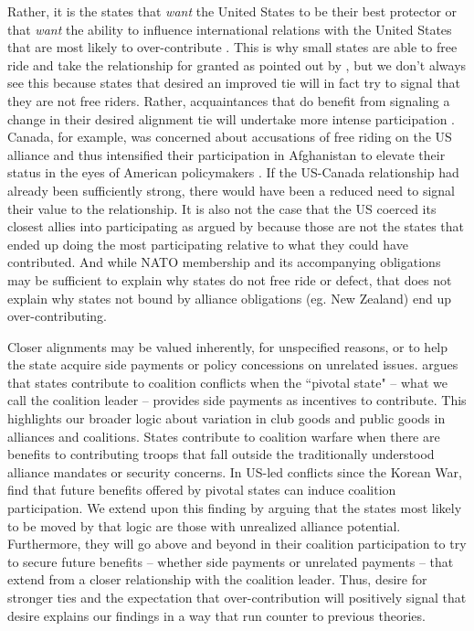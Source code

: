 \documentclass[12pt,letterpaper]{article}
\begin{document}
	Rather, it is the states that \textit{want} the United States to be their best protector or that \textit{want} the ability to influence international relations with the United States that are most likely to over-contribute \citep{vonhlatky_greatasymmetryamerica_2010}. This is why small states are able to free ride and take the relationship for granted as pointed out by \citet{keohane_biginfluencesmall_1971}, but we don't always see this because states that desired an improved tie will in fact try to signal that they are not free riders. Rather, acquaintances that do benefit from signaling a change in their desired alignment tie will undertake more intense participation \citep{gibler_priorcommitmentscompatible_2004, gartzke_contractsfriendsalliances_2012}. Canada, for example, was concerned about accusations of free riding on the US alliance and thus intensified their participation in Afghanistan to elevate their status in the eyes of American policymakers \citep{massie_alliancevaluestatus_2018}. If the US-Canada relationship had already been sufficiently strong, there would have been a reduced need to signal their value to the relationship. It is also not the case that the US coerced its closest allies into participating as argued by \citet{kupchan_natopersiangulf_1988} because those are not the states that ended up doing the most participating relative to what they could have contributed. And while NATO membership and its accompanying obligations may be sufficient to explain why states do not free ride or defect, that does not explain why states not bound by alliance obligations (eg. New Zealand) end up over-contributing.

	Closer alignments may be valued inherently, for unspecified reasons, or to help the state acquire side payments or policy concessions on unrelated issues. \citet{henke_buyingalliespayment_2019} argues that states contribute to coalition conflicts when the ``pivotal state" -- what we call the coalition leader -- provides side payments as incentives to contribute. This highlights our broader logic about variation in club goods and public goods in alliances and coalitions. States contribute to coalition warfare when there are benefits to contributing troops that fall outside the traditionally understood alliance mandates or security concerns. In US-led conflicts since the Korean War, \citet{henke_buyingalliespayment_2019} find that future benefits offered by pivotal states can induce coalition participation. We extend upon this finding by arguing that the states most likely to be moved by that logic are those with unrealized alliance potential. Furthermore, they will go above and beyond in their coalition participation to try to secure future benefits -- whether side payments or unrelated payments -- that extend from a closer relationship with the coalition leader. Thus, desire for stronger ties and the expectation that over-contribution will positively signal that desire explains our findings in a way that run counter to previous theories.
\end{document}
